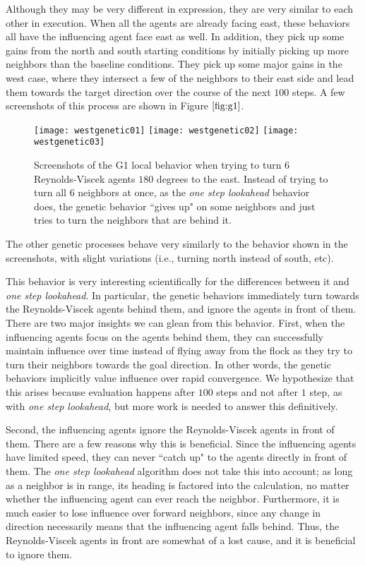 Although they may be very different in expression, they are very similar to each
other in execution.
When all the agents are already facing east, these behaviors all have the
influencing agent face east as well.
In addition, they pick up some gains from the north and south starting conditions
by initially picking up more neighbors than the baseline conditions.
They pick up some major gains in the west case, where they intersect a few of
the neighbors to their east side and lead them towards the target direction
over the course of the next $100$ steps.
A few screenshots of this process are shown in Figure $\ref{fig:g1}$.
\begin{figure}
    \centering
    \texttt{[image: westgenetic01]}
    \texttt{[image: westgenetic02]}
    \texttt{[image: westgenetic03]}
    \caption{Screenshots of the G1 local behavior when trying to turn $6$
    Reynolds-Viscek agents $180$ degrees to the east.
    Instead of trying to turn all $6$ neighbors at once, as the \textit{one step
    lookahead} behavior does, the genetic behavior ``gives up" on some neighbors
    and just tries to turn the neighbors that are behind it.}
    \label{fig:g1}
\end{figure}
The other genetic processes behave very similarly to the behavior shown in the
screenshots, with slight variations (i.e., turning north instead of south, etc).

This behavior is very interesting scientifically for the differences between it
and \textit{one step lookahead}.
In particular, the genetic behaviors immediately turn towards the Reynolds-Viscek
agents behind them, and ignore the agents in front of them.
There are two major insights we can glean from this behavior.
First, when the influencing agents focus on the agents behind them, they can
successfully maintain influence over time instead of flying away from the flock
as they try to turn their neighbors towards the goal direction.
In other words, the genetic behaviors implicitly value influence over rapid
convergence.
We hypothesize that this arises because evaluation happens after $100$ steps and
not after $1$ step, as with \textit{one step lookahead}, but more work is
needed to answer this definitively.

Second, the influencing agents ignore the Reynolds-Viscek agents in front of
them.
There are a few reasons why this is beneficial.
Since the influencing agents have limited speed, they can never ``catch
up" to the agents directly in front of them.
The \textit{one step lookahead} algorithm does not take this into account;
as long as a neighbor is in range, its heading is factored into the calculation,
no matter whether the influencing agent can ever reach the neighbor.
Furthermore, it is much easier to lose influence over forward neighbors, since
any change in direction necessarily means that the influencing agent falls
behind.
Thus, the Reynolds-Viscek agents in front are somewhat of a lost cause, and it
is beneficial to ignore them.

